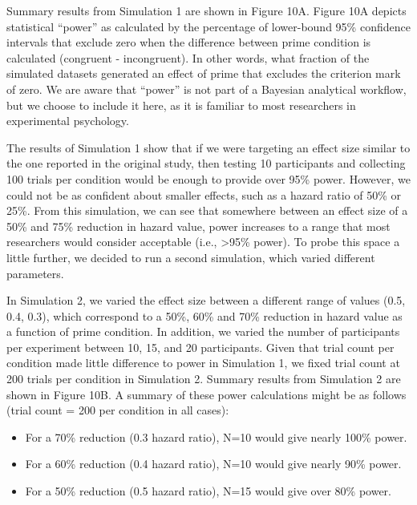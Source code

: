 \documentclass[
  man, donotrepeattitle,floatsintext]{apa6}
\providecommand{\tightlist}{%
  \setlength{\itemsep}{0pt}\setlength{\parskip}{0pt}}
\begin{document}
Summary results from Simulation 1 are shown in Figure 10A.
Figure 10A depicts statistical ``power'' as calculated by the percentage of lower-bound 95\% confidence intervals that exclude zero when the difference between prime condition is calculated (congruent - incongruent).
In other words, what fraction of the simulated datasets generated an effect of prime that excludes the criterion mark of zero.
We are aware that ``power'' is not part of a Bayesian analytical workflow, but we choose to include it here, as it is familiar to most researchers in experimental psychology.

The results of Simulation 1 show that if we were targeting an effect size similar to the one reported in the original study, then testing 10 participants and collecting 100 trials per condition would be enough to provide over 95\% power.
However, we could not be as confident about smaller effects, such as a hazard ratio of 50\% or 25\%.
From this simulation, we can see that somewhere between an effect size of a 50\% and 75\% reduction in hazard value, power increases to a range that most researchers would consider acceptable (i.e., \textgreater95\% power).
To probe this space a little further, we decided to run a second simulation, which varied different parameters.

In Simulation 2, we varied the effect size between a different range of values (0.5, 0.4, 0.3), which correspond to a 50\%, 60\% and 70\% reduction in hazard value as a function of prime condition.
In addition, we varied the number of participants per experiment between 10, 15, and 20 participants.
Given that trial count per condition made little difference to power in Simulation 1, we fixed trial count at 200 trials per condition in Simulation 2.
Summary results from Simulation 2 are shown in Figure 10B.
A summary of these power calculations might be as follows (trial count = 200 per condition in all cases):

\begin{itemize}
\tightlist
\item
  For a 70\% reduction (0.3 hazard ratio), N=10 would give nearly 100\% power.
\item
  For a 60\% reduction (0.4 hazard ratio), N=10 would give nearly 90\% power.
\item
  For a 50\% reduction (0.5 hazard ratio), N=15 would give over 80\% power.
\end{itemize}
\end{document}
